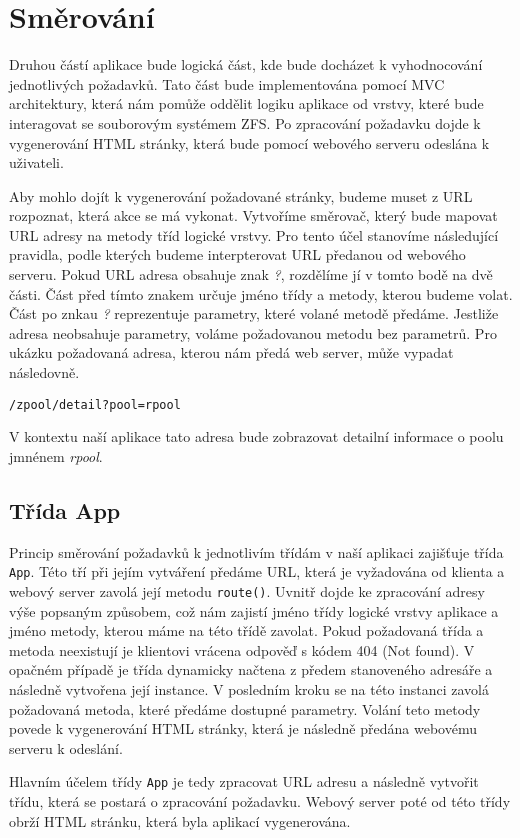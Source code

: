 \section{Směrování}
Druhou částí aplikace bude logická část, kde bude docházet k vyhodnocování jednotlivých požadavků. Tato část bude implementována pomocí MVC architektury, která nám pomůže oddělit logiku aplikace od vrstvy, které bude interagovat se souborovým systémem ZFS. Po zpracování požadavku dojde k vygenerování HTML stránky, která bude pomocí webového serveru odeslána k uživateli.

Aby mohlo dojít k vygenerování požadované stránky, budeme muset z URL rozpoznat, která akce se má vykonat. Vytvoříme směrovač, který bude mapovat URL adresy na metody tříd logické vrstvy. Pro tento účel stanovíme následující pravidla, podle kterých budeme interpterovat URL předanou od webového serveru. Pokud URL adresa obsahuje znak \emph{?}, rozdělíme jí v tomto bodě na dvě části. Část před tímto znakem určuje jméno třídy a metody, kterou budeme volat. Část po znkau \emph{?} reprezentuje parametry, které volané metodě předáme. Jestliže adresa neobsahuje parametry, voláme požadovanou metodu bez parametrů. Pro ukázku požadovaná adresa, kterou nám předá web server, může vypadat následovně.
\begin{verbatim}
/zpool/detail?pool=rpool
\end{verbatim}

V kontextu naší aplikace tato adresa bude zobrazovat detailní informace o poolu jmnénem \emph{rpool}.
    \subsection{Třída App}
    Princip směrování požadavků k jednotlivím třídám v naší aplikaci zajišťuje třída \verb|App|. Této tří při jejím vytváření předáme URL, která je vyžadována od klienta a webový server zavolá její metodu \verb|route()|. Uvnitř dojde ke zpracování adresy výše popsaným způsobem, což nám zajistí jméno třídy logické vrstvy aplikace a jméno metody, kterou máme na této třídě zavolat. Pokud požadovaná třída a metoda neexistují je klientovi vrácena odpověď s kódem 404 (Not found). V opačném případě je třída dynamicky načtena z předem stanoveného adresáře a následně vytvořena její instance. V posledním kroku se na této instanci zavolá požadovaná metoda, které předáme dostupné parametry. Volání teto metody povede k vygenerování HTML stránky, která je následně předána webovému serveru k odeslání.

    Hlavním účelem třídy \verb|App| je tedy zpracovat URL adresu a následně vytvořit třídu, která se postará o zpracování požadavku. Webový server poté od této třídy obrží HTML stránku, která byla aplikací vygenerována.

